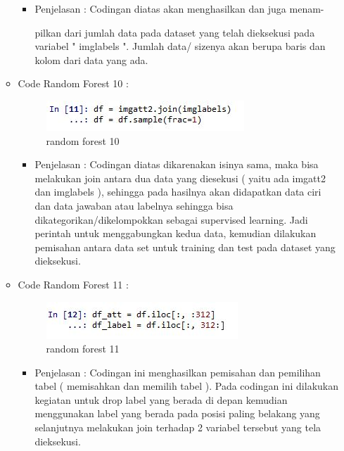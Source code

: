 \begin{enumerate}
\begin{itemize}
\begin{itemize}
\item Penjelasan : Codingan diatas akan menghasilkan dan juga menam-
\par pilkan dari jumlah data pada dataset yang telah dieksekusi pada variabel " imglabels ". Jumlah data/ sizenya akan berupa baris dan kolom dari data yang ada.
\par
\par
\end{itemize}
\item Code Random Forest 10 :
\par
\begin{figure}[ht]
\centering
\includegraphics[scale=0.2]{figures/ran10.jpg}
\caption{random forest 10}
\label{contoh}
\end{figure}
\par
\begin{itemize}
\item Penjelasan : Codingan diatas dikarenakan isinya sama, maka bisa melakukan join antara dua data yang diesekusi ( yaitu ada imgatt2 dan imglabels ), sehingga pada hasilnya akan didapatkan data ciri dan data jawaban atau labelnya sehingga bisa dikategorikan/dikelompokkan sebagai supervised learning. Jadi perintah untuk menggabungkan kedua data, kemudian dilakukan pemisahan antara data set untuk training dan test pada dataset yang dieksekusi.
\par
\par
\end{itemize}
\item Code Random Forest 11 :
\par
\begin{figure}[ht]
\centering
\includegraphics[scale=0.2]{figures/ran11.jpg}
\caption{random forest 11}
\label{contoh}
\end{figure}
\par
\begin{itemize}
\item Penjelasan : Codingan ini menghasilkan pemisahan dan pemilihan tabel ( memisahkan dan memilih tabel ). Pada codingan ini dilakukan kegiatan untuk drop label yang berada di depan kemudian menggunakan label yang berada pada posisi paling belakang yang selanjutnya melakukan join terhadap 2 variabel tersebut yang tela dieksekusi.

\end{itemize}
\end{itemize}
\end{enumerate}
